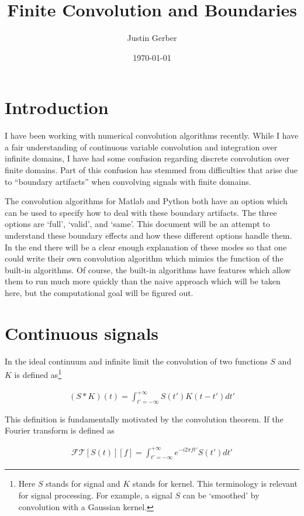 \documentclass[12pt]{article}
\begin{document}
\title{Finite Convolution and Boundaries}
\author{Justin Gerber}
\date{\today}
\maketitle

\section{Introduction}

I have been working with numerical convolution algorithms recently. While I have a fair understanding of continuous variable convolution and integration over infinite domains, I have had some confusion regarding discrete convolution over finite domains. Part of this confusion has stemmed from difficulties that arise due to ``boundary artifacts'' when convolving signals with finite domains.

The convolution algorithms for Matlab and Python both have an option which can be used to specify how to deal with these boundary artifacts. The three options are `full', `valid', and `same'. This document will be an attempt to understand these boundary effects and how these different options handle them. In the end there will be a clear enough explanation of these modes so that one could write their own convolution algorithm which mimics the function of the built-in algorithms. Of course, the built-in algorithms have features which allow them to run much more quickly than the naive approach which will be taken here, but the computational goal will be figured out.

\section{Continuous signals}
In the ideal continuum and infinite limit the convolution of two functions $S$ and $K$ is defined as\footnote{Here $S$ stands for signal and $K$ stands for kernel. This terminology is relevant for signal processing. For example, a signal $S$ can be `smoothed' by convolution with a Gaussian kernel.}

\begin{align}
(S\ast K)(t) = \int_{t'=-\infty}^{+\infty} S(t')K(t-t') dt'
\end{align}

This definition is fundamentally motivated by the convolution theorem. If the Fourier transform is defined as

\begin{align}
\mathcal{FT}[S(t)][f] = \int_{t'=-\infty}^{+\infty} e^{-i2\pi f t'} S(t') dt'
\end{align}
\end{document}

